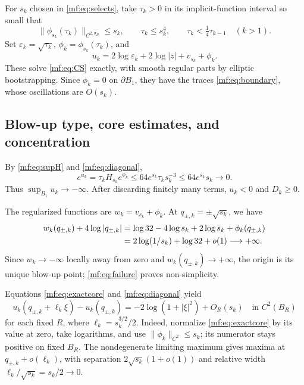 \documentclass[11pt,reqno]{amsart}
\numberwithin{equation}{section}
\theoremstyle{definition}
\theoremstyle{remark}
\newcommand{\eps}{\varepsilon}
\begin{document}
For $s_k$ chosen in \eqref{mf:eq:selects}, take $\tau_k>0$ in its
implicit-function interval so small that
\begin{equation}\label{mf:eq:diagonal}
\|\phi_{s_k}(\tau_k)\|_{C^{2,\sigma_H}}\le s_k,
\qquad \tau_k\le s_k^4,
\qquad \tau_k<\tfrac14\tau_{k-1}\quad(k>1).
\end{equation}
Set $\eps_k=\sqrt{\tau_k}$, $\phi_k=\phi_{s_k}(\tau_k)$, and
\begin{equation}\label{mf:eq:solution}
u_k=2\log\eps_k+2\log|z|+v_{s_k}+\phi_k.
\end{equation}
These solve \eqref{mf:eq:CS} exactly, with smooth regular parts by
elliptic bootstrapping. Since $\phi_k=0$ on $\partial B_1$, they have
the traces \eqref{mf:eq:boundary}, whose oscillations are $O(s_k)$.

\subsection{Blow-up type, core estimates, and concentration}

By \eqref{mf:eq:supH} and \eqref{mf:eq:diagonal},
\begin{equation}\label{mf:eq:MF}
e^{u_k}=\tau_kH_{s_k}e^{\phi_k}
\le64e^{s_k}\tau_ks_k^{-3}
\le64e^{s_k}s_k\longrightarrow0.
\end{equation}
Thus $\sup_{B_1}u_k\to-\infty$. After discarding finitely many terms,
$u_k<0$ and $D_k\ge0$.

The regularized functions are $w_k=v_{s_k}+\phi_k$. At
$q_{\pm,k}=\pm\sqrt{s_k}$, we have
\begin{align}\label{mf:eq:failure}
w_k(q_{\pm,k})+4\log|q_{\pm,k}|
&=\log32-4\log s_k+2\log s_k+\phi_k(q_{\pm,k})\notag\\
&=2\log(1/s_k)+\log32+o(1)\longrightarrow+\infty.
\end{align}
Since $w_k\to-\infty$ locally away from zero and
$w_k(q_{\pm,k})\to+\infty$, the origin is its unique blow-up point;
\eqref{mf:eq:failure} proves non-simplicity.

Equations \eqref{mf:eq:exactcore} and \eqref{mf:eq:diagonal} yield
\begin{equation}\label{mf:eq:localprofile}
u_k(q_{\pm,k}+\ell_k\xi)-u_k(q_{\pm,k})
=-2\log(1+|\xi|^2)+O_R(s_k)
\quad\text{in }C^2(B_R)
\end{equation}
for each fixed $R$, where $\ell_k=s_k^{3/2}/2$.
Indeed, normalize \eqref{mf:eq:exactcore} by its value at zero,
take logarithms, and use $\|\phi_k\|_{C^2}\le s_k$; its numerator
stays positive on fixed $B_R$. The nondegenerate limiting maximum
gives maxima at $q_{\pm,k}+o(\ell_k)$, with separation
$2\sqrt{s_k}(1+o(1))$ and relative width $\ell_k/\sqrt{s_k}=s_k/2\to0$.
\end{document}
